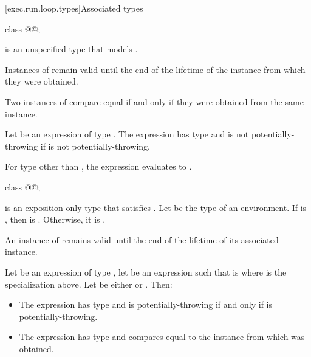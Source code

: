 [exec.run.loop.types]{Associated types}

\begin{itemdecl}
class @@;
\end{itemdecl}

\pnum
{} is an unspecified type
that models .

\pnum
Instances of  remain valid
until the end of the lifetime of the  instance
from which they were obtained.

\pnum
Two instances of  compare equal
if and only if they were obtained from the same  instance.

\pnum
Let  be an expression of type .
The expression 
has type  and
is not potentially-throwing if  is not potentially-throwing.

\pnum
For type  other than ,
the expression
evaluates to .

\begin{itemdecl}
class @@;
\end{itemdecl}

\pnum
{} is an exposition-only type
that satisfies .
Let  be the type of an environment.
If  is , then
 is
.
Otherwise, it is .

\pnum
An instance of  remains valid
until the end of the lifetime of its associated  instance.

\pnum
Let  be an expression of type ,
let  be an expression
such that  is 
where  is the  specialization above.
Let  be either  or .
Then:
\begin{itemize}
\item
The expression 
has type 
and is potentially-throwing if and only if
 is potentially-throwing.
\item
The expression 
has type  and
compares equal to the  instance
from which  was obtained.
\end{itemize}

